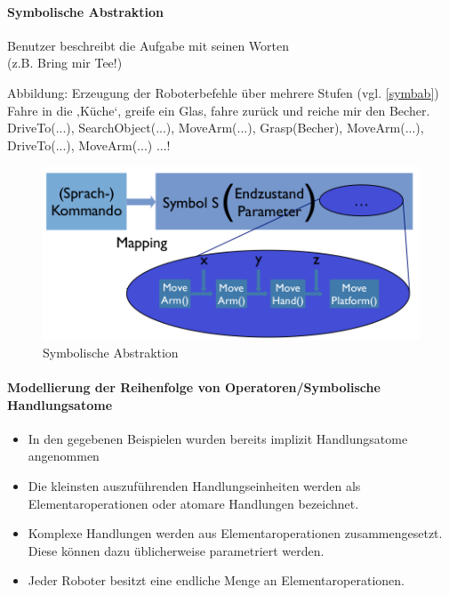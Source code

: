 \paragraph*{Symbolische Abstraktion}
Benutzer beschreibt die Aufgabe mit seinen Worten\\ (z.B. \glqq Bring mir Tee!\grqq) 
\begin{itemize}
\ita Abbildung: Erzeugung der Roboterbefehle über mehrere Stufen (vgl. \autoref{symbab})
\ita \glqq Fahre in die ‚Küche‘, greife ein Glas, fahre zurück und reiche mir den Becher.\grqq
\ita \glqq DriveTo(...), SearchObject(...), MoveArm(...), Grasp(Becher), MoveArm(...), DriveTo(...), MoveArm(...) ...!\grqq
\end{itemize}
\begin{figure}[h!]\centering 
\includegraphics[width=0.6\linewidth]{figures/ch02_symbab.png}
\caption{Symbolische Abstraktion}
\label{symbab}
\end{figure}
\paragraph*{Modellierung der Reihenfolge von Operatoren/Symbolische Handlungsatome}
\begin{itemize}
\item In den gegebenen Beispielen wurden bereits implizit Handlungsatome angenommen
\item Die kleinsten auszuführenden Handlungseinheiten werden als
Elementaroperationen oder atomare Handlungen bezeichnet.
\item Komplexe Handlungen werden aus Elementaroperationen zusammengesetzt. Diese
können dazu üblicherweise parametriert werden.
\item Jeder Roboter besitzt eine endliche Menge an Elementaroperationen.
\end{itemize}
